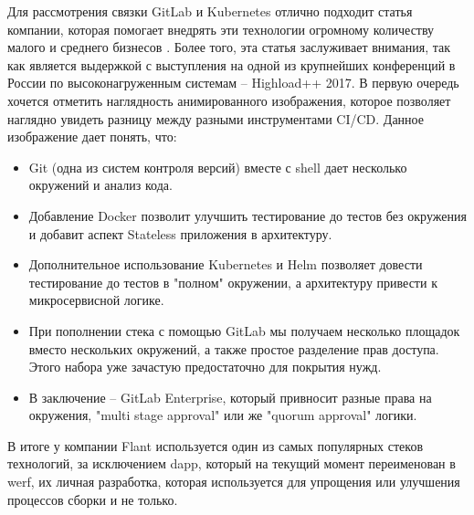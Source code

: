 Для рассмотрения связки GitLab и Kubernetes отлично подходит статья компании, которая помогает внедрять эти технологии огромному количеству малого и среднего бизнесов \cite{habr:flant:k8s-and-gitlab}. Более того, эта статья заслуживает внимания, так как является выдержкой с выступления на одной из крупнейших конференций в России по высоконагруженным системам -- Highload++ 2017. В первую очередь хочется отметить наглядность анимированного изображения, которое позволяет наглядно увидеть разницу между разными инструментами CI/CD.
Данное изображение дает понять, что:
\begin{itemize}
    \item Git (одна из систем контроля версий) \cite{def:git}
        вместе с shell
        дает несколько окружений и анализ кода.
    \item Добавление Docker позволит улучшить тестирование до тестов без окружения и добавит аспект Stateless
        приложения в архитектуру.
    \item Дополнительное использование Kubernetes и Helm позволяет довести тестирование до тестов в "полном" окружении, а архитектуру привести к микросервисной логике.
    \item При пополнении стека с помощью GitLab мы получаем несколько площадок вместо нескольких окружений, а также простое разделение прав доступа. Этого набора уже зачастую предостаточно для покрытия нужд.
    \item В заключение -- GitLab Enterprise, который привносит разные права на окружения, "multi stage approval"
        или же "quorum approval"
        логики.
\end{itemize}

В итоге у компании Flant используется один из самых популярных стеков технологий, за исключением dapp, который на текущий момент переименован в werf, их личная разработка, которая используется для упрощения или улучшения процессов сборки и не только.

